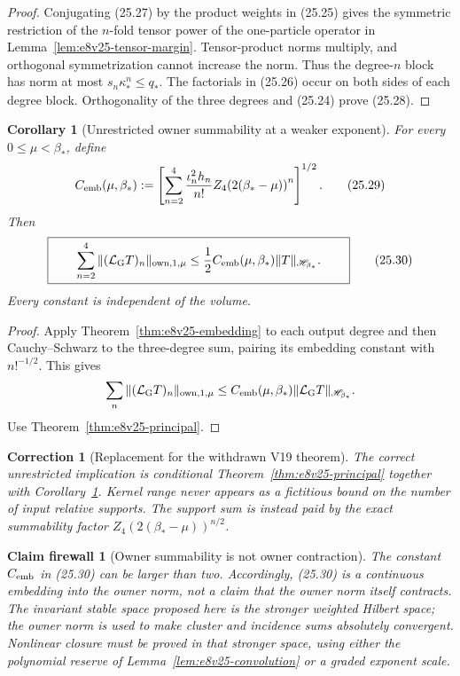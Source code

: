 \documentclass[11pt,oneside]{book}
\newtheorem{corollary}[theorem]{Corollary}
\newtheorem{firewall}[theorem]{Claim firewall}
\newtheorem{correction}[theorem]{Correction}
\theoremstyle{definition}
\theoremstyle{remark}
\begin{document}
\begin{proof}
Conjugating (25.27) by the product weights in (25.25) gives the
symmetric restriction of the \(n\)-fold tensor power of the
one-particle operator in Lemma~\ref{lem:e8v25-tensor-margin}.
Tensor-product norms multiply, and orthogonal symmetrization cannot
increase the norm.  Thus the degree-\(n\) block has norm at most
\(s_n\kappa_*^n\leq q_*\).  The factorials in (25.26) occur on both
sides of each degree block.  Orthogonality of the three degrees and
(25.24) prove (25.28).
\end{proof}

\begin{corollary}[Unrestricted owner summability at a weaker exponent]
\label{cor:e8v25-owner-output}
For every \(0\leq\mu<\beta_*\), define
\[
 C_{\rm emb}(\mu,\beta_*):=
 \left[
 \sum_{n=2}^4
 \frac{\iota_n^2h_n}{n!}
 Z_4\!\left(2(\beta_*-\mu)\right)^n
 \right]^{1/2}.                                                   \tag{25.29}
\]
Then
\[
\boxed{\qquad
 \sum_{n=2}^4
 \|(\mathcal L_{\rm G}T)_n\|_{{\rm own},1,\mu}
 \leq\frac12 C_{\rm emb}(\mu,\beta_*)
                  \|T\|_{\mathscr H_{\beta_*}} .
\qquad}                                                           \tag{25.30}
\]
Every constant is independent of the volume.
\end{corollary}

\begin{proof}
Apply Theorem~\ref{thm:e8v25-embedding} to each output degree and then
Cauchy--Schwarz to the three-degree sum, pairing its embedding
constant with \(n!^{-1/2}\).  This gives
\[
 \sum_n\|(\mathcal L_{\rm G}T)_n\|_{{\rm own},1,\mu}
 \leq C_{\rm emb}(\mu,\beta_*)
       \|\mathcal L_{\rm G}T\|_{\mathscr H_{\beta_*}}.
\]
Use Theorem~\ref{thm:e8v25-principal}.
\end{proof}

\begin{correction}[Replacement for the withdrawn V19 theorem]
\label{corr:e8v25-replacement}
The correct unrestricted implication is conditional
Theorem~\ref{thm:e8v25-principal} together with
Corollary~\ref{cor:e8v25-owner-output}.  Kernel range never appears as
a fictitious bound on the number of input relative supports.  The
support sum is instead paid by the exact summability factor
\(Z_4(2(\beta_*-\mu))^{n/2}\).
\end{correction}

\begin{firewall}[Owner summability is not owner contraction]
\label{fire:e8v25-owner-not-contraction}
The constant \(C_{\rm emb}\) in (25.30) can be larger than two.
Accordingly, (25.30) is a continuous embedding into the owner norm,
not a claim that the owner norm itself contracts.  The invariant
stable space proposed here is the stronger weighted Hilbert space;
the owner norm is used to make cluster and incidence sums absolutely
convergent.  Nonlinear closure must be proved in that stronger space,
using either the polynomial reserve of
Lemma~\ref{lem:e8v25-convolution} or a graded exponent scale.
\end{firewall}
\end{document}

